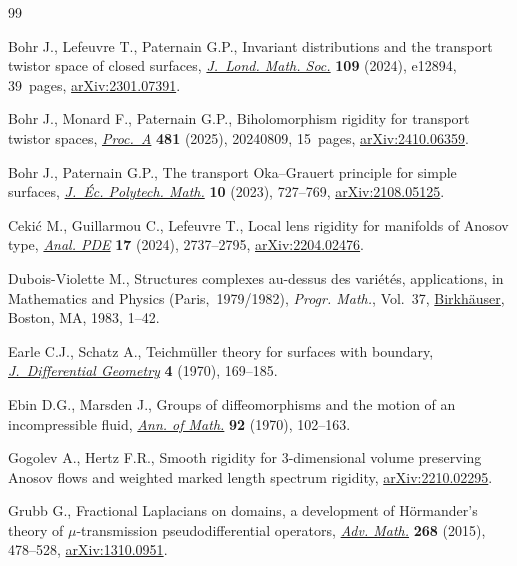 \documentclass[10pt,a4paper]{amsart}
\numberwithin{equation}{section}
\theoremstyle{definition}
\newcommand{\1}{{\bf 1}}
\begin{document}
\begin{thebibliography}{99}
\footnotesize\itemsep=0pt

Bohr J., Lefeuvre T., Paternain G.P., Invariant distributions and the transport
 twistor space of closed surfaces,
 \href{https://doi.org/10.1112/jlms.12894}{\textit{J.~Lond. Math. Soc.}}
 \textbf{109} (2024), e12894, 39~pages,
 \href{http://arxiv.org/abs/2301.07391}{arXiv:2301.07391}.

Bohr J., Monard F., Paternain G.P., Biholomorphism rigidity for transport
 twistor spaces,
 \href{https://doi.org/10.1098/rspa.2024.0809}{\textit{Proc.~A}} \textbf{481}
 (2025), 20240809, 15~pages,
 \href{http://arxiv.org/abs/2410.06359}{arXiv:2410.06359}.

Bohr J., Paternain G.P., The transport {O}ka--{G}rauert principle for simple
 surfaces, \href{https://doi.org/10.5802/jep.231}{\textit{J.~\'{E}c. Polytech.
 Math.}} \textbf{10} (2023), 727--769,
 \href{http://arxiv.org/abs/2108.05125}{arXiv:2108.05125}.

Ceki\'c M., Guillarmou C., Lefeuvre T., Local lens rigidity for manifolds of
 {A}nosov type, \href{https://doi.org/10.2140/apde.2024.17.2737}{\textit{Anal.
 PDE}} \textbf{17} (2024), 2737--2795,
 \href{http://arxiv.org/abs/2204.02476}{arXiv:2204.02476}.

Dubois-Violette M., Structures complexes au-dessus des vari\'et\'es,
 applications, in Mathematics and {P}hysics ({P}aris,~1979/1982),
 \textit{Progr. Math.}, Vol.~37,
 \href{https://doi.org/10.1007/BF02591680}{Birkh\"auser}, Boston, MA, 1983,
 1--42.

Earle C.J., Schatz A., Teichm\"uller theory for surfaces with boundary,
 \href{https://doi.org/10.4310/jdg/1214429381}{\textit{J.~Differential
 Geometry}} \textbf{4} (1970), 169--185.

Ebin D.G., Marsden J., Groups of diffeomorphisms and the motion of an
 incompressible fluid, \href{https://doi.org/10.2307/1970699}{\textit{Ann. of
 Math.}} \textbf{92} (1970), 102--163.

Gogolev A., Hertz F.R., Smooth rigidity for 3-dimensional volume preserving
 {A}nosov flows and weighted marked length spectrum rigidity,
 \href{http://arxiv.org/abs/2210.02295}{arXiv:2210.02295}.

Grubb G., Fractional {L}aplacians on domains, a development of {H}\"ormander's
 theory of {$\mu$}-transmission pseudodifferential operators,
 \href{https://doi.org/10.1016/j.aim.2014.09.018}{\textit{Adv. Math.}}
 \textbf{268} (2015), 478--528,
 \href{http://arxiv.org/abs/1310.0951}{arXiv:1310.0951}.


\end{thebibliography}
\end{document}
